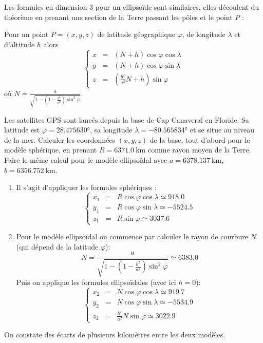\documentclass[class=report,crop=false]{standalone}
\begin{document}
Les formules en dimension $3$ pour un ellipsoïde sont similaires, elles découlent du théorème
en prenant une section de la Terre passant les pôles et le point $P$ :
\begin{corollaire}
Pour un point $P = (x,y,z)$ de latitude géographique $\varphi$, 
de longitude $\lambda$ et d'altitude $h$ alors 
$$\left\{ 
\begin{array}{rcl}
x &=& (N+h) \cos \varphi \cos\lambda \\
y &=& (N+h) \cos \varphi \sin\lambda \\
z &=& \left(\frac{b^2}{a^2}N+h\right)\sin\varphi 
\end{array}
\right.$$
où 
$\displaystyle N = \frac{a}{\sqrt{1-\left(1-\frac{b^2}{a^2}\right)\sin^2 \varphi}}.$
\end{corollaire}

\begin{exemple}
Les satellites GPS sont lancés depuis la base de Cap Canaveral en Floride.
Sa latitude est $\varphi = \ang{28.475630}$, 
sa longitude $\lambda = \ang{-80.565834}$
et se situe au niveau de la mer.
Calculer les coordonnées $(x,y,z)$ de la base, tout d'abord pour le modèle sphérique, en prenant
$R = \SI{6 371,0}{\kilo\meter}$ comme rayon moyen de la Terre.
Faire le même calcul pour le modèle ellipsoïdal avec
$a = \SI{6378.137}{\kilo\meter}$, $b = \SI{6356.752}{\kilo\meter}$.

\begin{enumerate}
  \item Il s'agit d'appliquer les formules sphériques :
$$\left\{\begin{array}{rcl}
x_1 & = & R \cos \varphi \cos \lambda \simeq \num{918.0}\\
y_1 & = & R \cos \varphi \sin \lambda \simeq \num{-5524.5}\\
z_1 & = & R \sin \varphi \simeq \num{3037.6}
\end{array}\right.$$  

  \item Pour le modèle ellipsoïdal on commence par calculer le rayon de 
  courbure $N$ (qui dépend de la latitude $\varphi$):
  $$N = \frac{a}{\sqrt{1-\left(1-\frac{b^2}{a^2}\right)\sin^2 \varphi}}\simeq \num{6383.0}$$
  Puis on applique les formules ellipsoïdales (avec ici $h=0$):
$$\left\{ 
\begin{array}{rcl}
x_2 &=& N \cos \varphi \cos\lambda  \simeq \num{919.7}\\
y_2 &=& N \cos \varphi \sin\lambda  \simeq \num{-5534.9}\\
z_2 &=& \frac{b^2}{a^2}N \sin\varphi  \simeq \num{3022.9}
\end{array}
\right.$$  
\end{enumerate}
On constate des écarts de plusieurs kilomètres entre les deux modèles.




\end{exemple}
\end{document}
